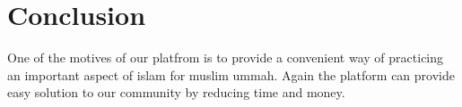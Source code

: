 \documentclass[a4paper,12pt]{report}
\begin{document}
\section*{Conclusion}
One of the motives of our platfrom is to provide a convenient way of practicing an important aspect of islam for muslim ummah. Again the platform can provide easy solution to our community by reducing time and money.
\end{document}
